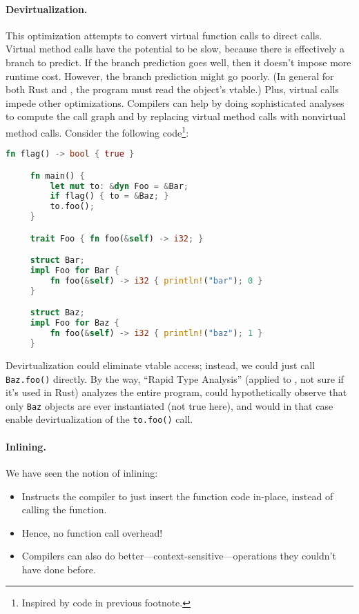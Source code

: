 \paragraph{Devirtualization.} This optimization attempts to convert
virtual function calls to direct calls.  Virtual method calls have the
potential to be slow, because there is effectively a branch to
predict. If the branch prediction goes well, then it doesn't impose
more runtime cost. However, the branch prediction might go poorly.  (In
general for both Rust and \CPP, the program must read the object's vtable.) Plus, virtual
calls impede other optimizations. Compilers can help by doing
sophisticated analyses to compute the call graph and by replacing
virtual method calls with nonvirtual method calls.  Consider the
following code\footnote{Inspired by code in previous footnote.}:
  \begin{lstlisting}[language=Rust]
     fn flag() -> bool { true }

     fn main() {
         let mut to: &dyn Foo = &Bar;
         if flag() { to = &Baz; }
         to.foo();
     }

     trait Foo { fn foo(&self) -> i32; }

     struct Bar;
     impl Foo for Bar {
         fn foo(&self) -> i32 { println!("bar"); 0 }
     }

     struct Baz;
     impl Foo for Baz {
         fn foo(&self) -> i32 { println!("baz"); 1 }
     }
  \end{lstlisting}
Devirtualization could eliminate vtable access; instead, we could just call {\tt Baz.foo()} 
directly. By the way, ``Rapid Type Analysis'' (applied to \CPP, not sure if it's used in Rust)
analyzes the entire program, could hypothetically observe that
only {\tt Baz} objects are ever instantiated (not true here), and would in that case
enable devirtualization
of the {\tt to.foo()} call.

\paragraph{Inlining.} We have seen the notion of inlining:
  \begin{itemize}[noitemsep]
    \item Instructs the compiler to just insert the function code in-place,
      instead of calling the function.
    \item Hence, no function call overhead!
    \item Compilers can also do better---context-sensitive---operations they couldn't
      have done before.
  \end{itemize}

